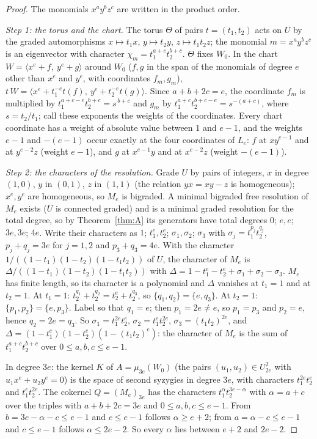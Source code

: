 \documentclass[11pt]{article}
\theoremstyle{definition}
\theoremstyle{remark}
\begin{document}
\begin{proof}
The monomials $x^ay^bz^c$ are written in the product order.

\emph{Step 1: the torus and the chart.} The torus $\Theta$ of pairs $t=(t_1,t_2)$ acts on $U$ by the graded automorphisms $x\mapsto t_1x$, $y\mapsto t_2y$, $z\mapsto t_1t_2z$; the monomial $m=x^ay^bz^c$ is an eigenvector with character $\chi_m=t_1^{a+c}t_2^{b+c}$. $\Theta$ fixes $W_0$. In the chart $W=\langle x^e+f,\ y^e+g\rangle$ around $W_0$ ($f,g$ in the span of the monomials of degree $e$ other than $x^e$ and $y^e$, with coordinates $f_m,g_m$), $t\,W=\langle x^e+t_1^{-e}t(f),\ y^e+t_2^{-e}t(g)\rangle$. Since $a+b+2c=e$, the coordinate $f_m$ is multiplied by $t_1^{a+c-e}t_2^{b+c}=s^{\,b+c}$ and $g_m$ by $t_1^{a+c}t_2^{b+c-e}=s^{-(a+c)}$, where $s=t_2/t_1$; call these exponents the weights of the coordinates. Every chart coordinate has a weight of absolute value between $1$ and $e-1$, and the weights $e-1$ and $-(e-1)$ occur exactly at the four coordinates of $L_e$: $f$ at $xy^{e-1}$ and at $y^{e-2}z$ (weight $e-1$), and $g$ at $x^{e-1}y$ and at $x^{e-2}z$ (weight $-(e-1)$).

\emph{Step 2: the characters of the resolution.} Grade $U$ by pairs of integers, $x$ in degree $(1,0)$, $y$ in $(0,1)$, $z$ in $(1,1)$ (the relation $yx=xy-z$ is homogeneous); $x^e,y^e$ are homogeneous, so $M_e$ is bigraded. A minimal bigraded free resolution of $M_e$ exists ($U$ is connected graded) and is a minimal graded resolution for the total degree, so by Theorem~\ref{thm:A} its generators have total degrees $0$; $e,e$; $3e,3e$; $4e$. Write their characters as $1$; $t_1^e,t_2^e$; $\sigma_1,\sigma_2$; $\sigma_3$ with $\sigma_j=t_1^{p_j}t_2^{q_j}$, $p_j+q_j=3e$ for $j=1,2$ and $p_3+q_3=4e$. With the character $1/((1-t_1)(1-t_2)(1-t_1t_2))$ of $U$, the character of $M_e$ is $\Delta/((1-t_1)(1-t_2)(1-t_1t_2))$ with $\Delta=1-t_1^e-t_2^e+\sigma_1+\sigma_2-\sigma_3$. $M_e$ has finite length, so its character is a polynomial and $\Delta$ vanishes at $t_1=1$ and at $t_2=1$. At $t_1=1$: $t_2^{q_1}+t_2^{q_2}=t_2^e+t_2^{q_3}$, so $\{q_1,q_2\}=\{e,q_3\}$. At $t_2=1$: $\{p_1,p_2\}=\{e,p_3\}$. Label so that $q_1=e$; then $p_1=2e\ne e$, so $p_1=p_3$ and $p_2=e$, hence $q_2=2e=q_3$. So $\sigma_1=t_1^{2e}t_2^e$, $\sigma_2=t_1^et_2^{2e}$, $\sigma_3=(t_1t_2)^{2e}$, and $\Delta=(1-t_1^e)(1-t_2^e)(1-(t_1t_2)^e)$: the character of $M_e$ is the sum of $t_1^{a+c}t_2^{b+c}$ over $0\le a,b,c\le e-1$.

In degree $3e$: the kernel $K$ of $A=\mu_{3e}(W_0)$ (the pairs $(u_1,u_2)\in U_{2e}^2$ with $u_1x^e+u_2y^e=0$) is the space of second syzygies in degree $3e$, with characters $t_1^{2e}t_2^e$ and $t_1^et_2^{2e}$. The cokernel $Q=(M_e)_{3e}$ has the characters $t_1^{\alpha}t_2^{3e-\alpha}$ with $\alpha=a+c$ over the triples with $a+b+2c=3e$ and $0\le a,b,c\le e-1$. From $b=3e-\alpha-c\le e-1$ and $c\le e-1$ follows $\alpha\ge e+2$; from $a=\alpha-c\le e-1$ and $c\le e-1$ follows $\alpha\le2e-2$. So every $\alpha$ lies between $e+2$ and $2e-2$.


\end{proof}
\end{document}
